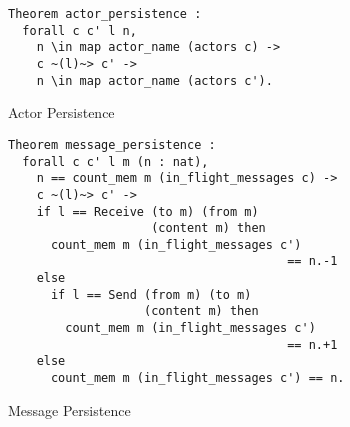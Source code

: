 \begin{figure}[tb]
\begin{lstlisting}[style=small]
Theorem actor_persistence :
  forall c c' l n,
    n \in map actor_name (actors c) ->
    c ~(l)~> c' ->
    n \in map actor_name (actors c').
\end{lstlisting}
\caption{Actor Persistence}\label{fig:coq:actorpersistence}
\end{figure}

\begin{figure}[tb]
\begin{lstlisting}[style=small]
Theorem message_persistence :
  forall c c' l m (n : nat),
    n == count_mem m (in_flight_messages c) ->
    c ~(l)~> c' ->
    if l == Receive (to m) (from m)
                    (content m) then
      count_mem m (in_flight_messages c')
                                       == n.-1
    else
      if l == Send (from m) (to m)
                   (content m) then
        count_mem m (in_flight_messages c')
                                       == n.+1
    else
      count_mem m (in_flight_messages c') == n.
\end{lstlisting}
\caption{Message Persistence}\label{fig:coq:messagepersistence}
\end{figure}
